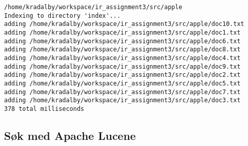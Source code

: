 \begin{lstlisting}[frame=single]  % Start your code-block
/home/kradalby/workspace/ir_assignment3/src/apple
Indexing to directory 'index'...
adding /home/kradalby/workspace/ir_assignment3/src/apple/doc10.txt
adding /home/kradalby/workspace/ir_assignment3/src/apple/doc1.txt
adding /home/kradalby/workspace/ir_assignment3/src/apple/doc6.txt
adding /home/kradalby/workspace/ir_assignment3/src/apple/doc8.txt
adding /home/kradalby/workspace/ir_assignment3/src/apple/doc4.txt
adding /home/kradalby/workspace/ir_assignment3/src/apple/doc9.txt
adding /home/kradalby/workspace/ir_assignment3/src/apple/doc2.txt
adding /home/kradalby/workspace/ir_assignment3/src/apple/doc5.txt
adding /home/kradalby/workspace/ir_assignment3/src/apple/doc7.txt
adding /home/kradalby/workspace/ir_assignment3/src/apple/doc3.txt
378 total milliseconds
\end{lstlisting}
\subsection*{Søk med Apache Lucene}
